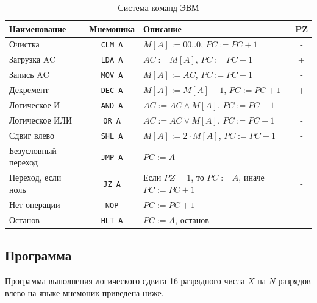 \documentclass[11pt, a4paper]{article}
\begin{document}
\begin{table}[h!]
	\centering
	\caption{Система команд ЭВМ}
	\begin{tabular}{|l|c|l|c|}
		\hline
		\textbf{Наименование} & \textbf{Мнемоника} & \textbf{Описание}                                 & \textbf{PZ} \\
		\hline
		Очистка               & \texttt{CLM A}     & $M[A] := 00..0$, $PC := PC + 1$                   & -           \\
		\hline
		Загрузка AC           & \texttt{LDA A}     & $AC := M[A]$, $PC := PC + 1$                      & +           \\
		\hline
		Запись AC             & \texttt{MOV A}     & $M[A] := AC$, $PC := PC + 1$                      & -           \\
		\hline
		Декремент             & \texttt{DEC A}     & $M[A] := M[A] - 1$, $PC := PC + 1$                & +           \\
		\hline
		Логическое И          & \texttt{AND A}     & $AC := AC \wedge M[A]$, $PC := PC + 1$            & -           \\
		\hline
		Логическое ИЛИ        & \texttt{OR A}      & $AC := AC \vee M[A]$, $PC := PC + 1$              & -           \\
		\hline
		Сдвиг влево           & \texttt{SHL A}     & $M[A] := 2 \cdot M[A]$, $PC := PC + 1$            & -           \\
		\hline
		Безусловный переход   & \texttt{JMP A}     & $PC := A$                                         & -           \\
		\hline
		Переход, если ноль    & \texttt{JZ A}      & Если $PZ = 1$, то $PC := A$, иначе $PC := PC + 1$ & -           \\
		\hline
		Нет операции          & \texttt{NOP}       & $PC := PC + 1$                                    & -           \\
		\hline
		Останов               & \texttt{HLT A}     & $PC := A$, останов                                & -           \\
		\hline
	\end{tabular}
\end{table}
\newpage
\subsection{Программа}
Программа выполнения логического сдвига 16-разрядного числа $X$ на $N$ разрядов влево на языке мнемоник приведена ниже.
\end{document}

